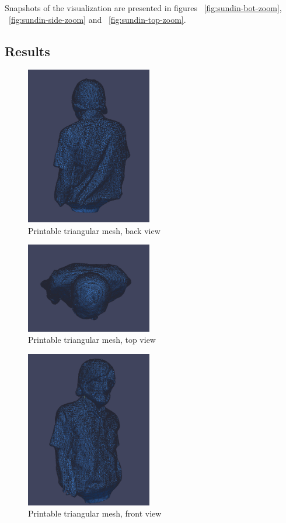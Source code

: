 Snapshots of the visualization are presented in figures ~\ref{fig:sundin-bot-zoom}, ~\ref{fig:sundin-side-zoom} and ~\ref{fig:sundin-top-zoom}.
\subsection{Results} 

\begin{figure}[ht!]
  \centering
    \includegraphics[width=0.49\textwidth]{figures/sundinPCLback.png}
    \caption{Printable triangular mesh, back view}
    \label{fig:sundin-back-pcl}
\end{figure}

\begin{figure}[ht!]
  \centering
    \includegraphics[width=0.49\textwidth]{figures/sundinPCLtop.png}
    \caption{Printable triangular mesh, top view}
    \label{fig:sundin-top-pcl}
\end{figure}

\begin{figure}[ht!]
  \centering
    \includegraphics[width=0.49\textwidth]{figures/sundinPCLFront.png}
    \caption{Printable triangular mesh, front view}
    \label{fig:sundin-front-pcl}
\end{figure}



